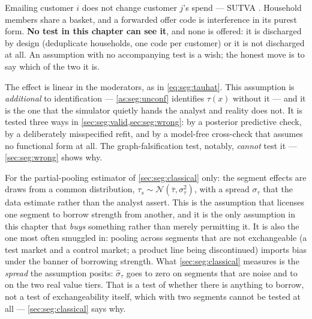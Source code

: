 \begin{assumption}[No interference]\label{as:seg:sutva}
Emailing customer $i$ does not change customer $j$'s spend --- SUTVA \citep{imbens2015}. Household
members share a basket, and a forwarded offer code is interference in its purest form. \textbf{No
test in this chapter can see it}, and none is offered: it is discharged by design (deduplicate
households, one code per customer) or it is not discharged at all. An assumption with no
accompanying test is a wish; the honest move is to say which of the two it is.
\end{assumption}

\begin{assumption}\label{as:seg:form}
The effect is linear in the moderators, as in \cref{eq:seg:tauhat}. This assumption is
\emph{additional} to identification --- \cref{as:seg:unconf} identifies $\tau(x)$ without it --- and
it is the one that the simulator quietly hands the analyst and reality does not. It is tested three
ways in \cref{sec:seg:valid,sec:seg:wrong}: by a posterior predictive check, by a deliberately
misspecified refit, and by a model-free cross-check that assumes no functional form at all. The
graph-falsification test, notably, \emph{cannot} test it --- \cref{sec:seg:wrong} shows why.
\end{assumption}

\begin{assumption}\label{as:seg:exch}
For the partial-pooling estimator of \cref{sec:seg:classical} only: the segment effects are draws
from a common distribution, $\tau_s \sim \mathcal N(\bar\tau, \sigma_\tau^2)$, with a spread
$\sigma_\tau$ that the data estimate rather than the analyst assert. This is the assumption that
licenses one segment to borrow strength from another, and it is the only assumption in this chapter
that \emph{buys} something rather than merely permitting it. It is also the one most often smuggled
in: pooling across segments that are not exchangeable (a test market and a control market; a
product line being discontinued) imports bias under the banner of borrowing strength. What
\cref{sec:seg:classical} measures is the \emph{spread} the assumption posits: $\hat\sigma_\tau$
goes to zero on segments that are noise and to \eur{\nbTwoRealSigma} on the two real value tiers.
That is a test of whether there is anything to borrow, not a test of exchangeability itself, which
with two segments cannot be tested at all --- \cref{sec:seg:classical} says why.
\end{assumption}

